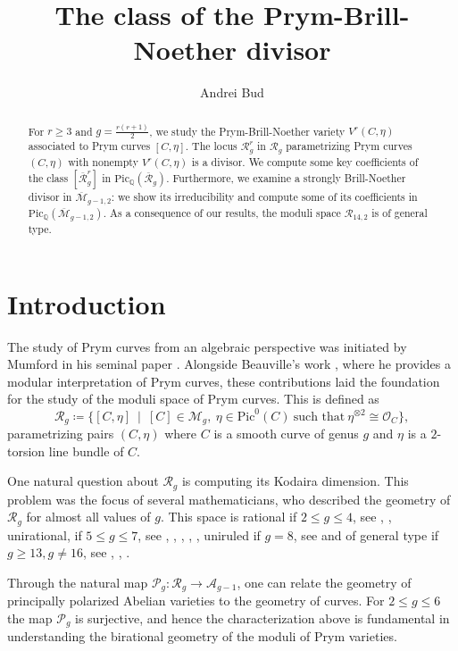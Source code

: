\documentclass{article}
\theoremstyle{plain}
\theoremstyle{definition}
\def\OO{\mathcal{O}}
\def\cM{\mathcal{M}}
\def\cR{\mathcal{R}}
\begin{document}
\title{The class of the Prym-Brill-Noether divisor}

\author{Andrei Bud}
\date{}
\maketitle
\begin{abstract}
	For $r\geq 3$ and $g= \frac{r(r+1)}{2}$, we study the Prym-Brill-Noether variety $V^r(C,\eta)$ associated to Prym curves $[C,\eta]$. The locus $\mathcal{R}_g^r$ in $\mathcal{R}_g$ parametrizing Prym curves $(C, \eta)$ with nonempty $V^r(C,\eta)$ is a divisor. We compute some key coefficients of the class $[\overline{\mathcal{R}}_g^r]$ in $\mathrm{Pic}_\mathbb{Q}(\overline{\mathcal{R}}_g)$. Furthermore, we examine a strongly Brill-Noether divisor in $\overline{\mathcal{M}}_{g-1,2}$: we show its irreducibility and compute some of its coefficients in $\mathrm{Pic}_\mathbb{Q}(\overline{\mathcal{M}}_{g-1,2})$. As a consequence of our results, the moduli space $\mathcal{R}_{14,2}$ is of general type. 
\end{abstract}
\section{Introduction} 
 The study of Prym curves from an algebraic perspective was initiated by Mumford in his seminal paper \cite{MumfordPrym}. Alongside Beauville's work \cite{Beau77}, where he provides a modular interpretation of Prym curves, these contributions laid the foundation for the study of the moduli space of Prym curves. This is defined as
  $$\mathcal{R}_g \coloneqq \{[C,\eta] \ \mid \ [C] \in \cM_g, \ \eta\in \mathrm{Pic}^0(C) \ \textrm{such that} \ \eta^{\otimes 2} \cong \OO_C \},$$ 
 parametrizing pairs $(C, \eta)$ where $C$ is a smooth curve of genus $g$ and $\eta$ is a $2$-torsion line bundle of $C$. 
 
 One natural question about $\cR_g$ is computing its Kodaira dimension. This problem was the focus of several mathematicians, who described the geometry of $\mathcal{R}_g$ for almost all values of $g$. This space is rational if $2\leq g \leq 4$, see \cite{Dolgachev}, \cite{Catanese}, unirational, if $5\leq g \leq 7$, see \cite{MoriMukai}, \cite{DonagiA5}, \cite{VerraA4}, \cite{VerraA5}, \cite{Izadi}, \cite{FarVerNikulin} uniruled if $g = 8$, see \cite{FarVerNikulin} and of general type if $g\geq 13, g \neq 16$, see \cite{FarLud}, \cite{Bruns}, \cite{FarR13}. 
 
  Through the natural map $\mathcal{P}_g\colon\mathcal{R}_g \rightarrow \mathcal{A}_{g-1}$, one can relate the geometry of principally polarized Abelian varieties to the geometry of curves. For $2\leq g \leq 6$ the map $\mathcal{P}_g$ is surjective, and hence the characterization above is fundamental in understanding the birational geometry of the moduli of Prym varieties. 
 
\end{document}
